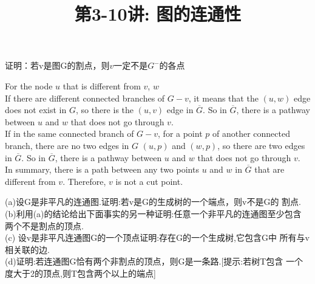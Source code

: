 \documentclass[a4paper, justified]{tufte-handout}
\title{第3-10讲: 图的连通性}
\date{\zhtoday} %
\begin{document}
\maketitle
\noplagiarism %
\begin{abstract}
\end{abstract}
\beginrequired

\begin{problem}[CZ 5.4]
证明：若v是图G的割点，则$v$一定不是$G^-$的各点
\end{problem}

\begin{solution}
  For the node $u$ that is different from $v$, $w$\\
  If there are different connected branches of $G-v$, it means that the $(u,w)$ edge does not exist in $G$, so there is the $(u,v)$ edge in $\overline{G}$. So in $\overline{G}$, there is a pathway between $u$ and $w$ that does not go through $v$. \\
  If in the same connected branch of $G-v$, for a point $p$ of another connected branch, there are no two edges in $G$ $(u,p)$ and $(w,p)$, so there are two edges in $\overline{G}$. So in $\overline{G}$, there is a pathway between $u$ and $w$ that does not go through $v$. \\
  In summary, there is a path between any two points $u$ and $w$ in $\overline{G}$ that are different from $v$. Therefore, $v$ is not a cut point.
\end{solution}

\begin{problem}[CZ 5.8]
(a)设G是非平凡的连通图.证明:若v是G的生成树的一个端点，则v不是G的
割点.\\
(b)利用(a)的结论给出下面事实的另一种证明:任意一个非平凡的连通图至少包含
两个不是割点的顶点.\\
(c) 设v是非平凡连通图G的一个顶点证明:存在G的一个生成树,它包含G中
所有与v相关联的边.\\
(d)证明:若连通图G恰有两个非割点的顶点，则G是一条路.[提示:若树T包含
一个度大于2的顶点,则T包含两个以上的端点]

\end{problem}
\end{document}
